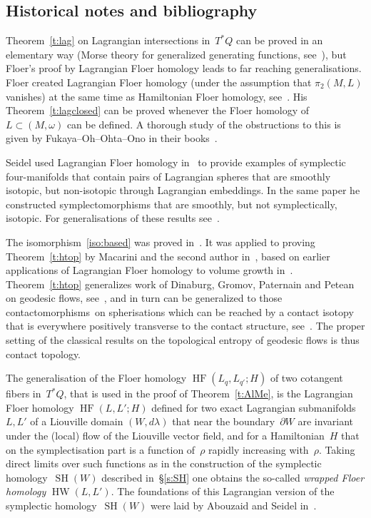 \documentclass[12pt,twoside]{amsart}
\theoremstyle{plain}
\numberwithin{figure}{section}
\numberwithin{equation}{section}
\def\HF{\operatorname{HF}}
\def\HW{\operatorname{HW}}
\def\SH{\operatorname{SH}}
\def\go{\omega}
\def\pp{\partial}
\begin{document}
\subsection*{Historical notes and bibliography}
Theorem~\ref{t:lag} on Lagrangian intersections in~$T^*Q$
can be proved in an elementary way 
(Morse theory for generalized generating functions, see~\cite{LaSi85}), 
but Floer's proof by Lagrangian Floer homology leads to far reaching generalisations.
%
Floer created Lagrangian Floer homology (under the assumption that $\pi_2 (M,L)$ vanishes)
at the same time as Hamiltonian Floer homology, see~\cite{Flo88:unreg, Flo88:Lag, Flo89:Witten}.
%
His Theorem~\ref{t:lagclosed} can be proved whenever the Floer homology of~$L \subset (M,\go)$
can be defined. A thorough study of the obstructions to this is given by
Fukaya--Oh--Ohta--Ono in their books~\cite{FOOO}.


Seidel used Lagrangian Floer homology in~\cite{Se99} to provide examples of symplectic four-manifolds
that contain pairs of Lagrangian spheres that are smoothly isotopic,
but non-isotopic through Lagrangian embeddings.
In the same paper he constructed symplectomorphisms that are smoothly, but not symplectically, 
isotopic.
For generalisations of these results see~\cite{Ke14, Se00}.

The isomorphism~\eqref{iso:based} was proved in~\cite{as06}.
It was applied to proving Theorem~\ref{t:htop} by Macarini and the second author in~\cite{MaSch11},
based on earlier applications of Lagrangian Floer homology to volume growth in~\cite{FrSch05, FrSch06}.
Theorem~\ref{t:htop} generalizes work of Dinaburg, Gromov, Paternain and Petean on geodesic flows,
see~\cite{Pat.book}, and in turn can be generalized to those contactomorphisms~on spherisations
which can be reached by a contact isotopy that is everywhere positively transverse to the contact 
structure, see~\cite{Dah16}.
The proper setting of the classical results on the topological entropy of geodesic flows is thus 
contact topology.

The generalisation of the Floer homology $\HF (L_q,L_{q'};H)$ of two cotangent fibers 
in~$T^*Q$, that is used in the proof of Theorem~\ref{t:AlMe},
is the Lagrangian Floer homology $\HF (L,L';H)$
defined for two exact Lagrangian submanifolds~$L,L'$ of a Liouville domain $(W,d\lambda)$
that near the boundary~$\pp W$ are invariant under the (local) flow of the Liouville vector field,
and for a Hamiltonian~$H$ that on the symplectisation part is a function of~$\rho$ 
rapidly increasing with~$\rho$.
Taking direct limits over such functions as in the construction of the symplectic homology~$\SH (W)$ described in~\S \ref{s:SH}
one obtains the so-called {\it wrapped Floer homology}\/ $\HW (L,L')$.
The foundations of this Lagrangian version of the symplectic homology~$\SH (W)$ 
were laid by Abouzaid and Seidel in~\cite{AbSe10}.
\end{document}
